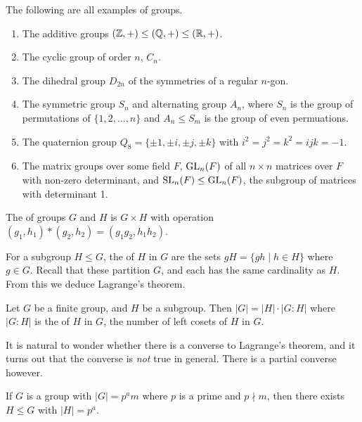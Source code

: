 \documentclass[a4paper]{scrartcl}
\begin{document}
\begin{example}
	The following are all examples of groups.
	\begin{enumerate}[label=(\roman*)]
		\item The additive groups $(\mathbb{Z}, +) \leq (\mathbb{Q}, +) \leq (\mathbb{R}, +)$.
		\item The cyclic group of order $n$, $C_n$.
		\item The dihedral group $D_{2n}$ of the symmetries of a regular $n$-gon.
		\item The symmetric group $S_n$ and alternating group $A_n$, where $S_n$ is the group of permutations of $\{1, 2, \dots, n\}$ and $A_n \leq S_m$ is the group of even permuations. 
		\item The quaternion group $Q_8 = \{\pm 1, \pm i, \pm j, \pm k \}$ with $i^2 = j^2 = k^2 = ijk = -1$.
		\item The matrix groups over some field $F$, $\operatorname{GL}_n(F)$ of all $n \times n$ matrices over $F$ with non-zero determinant, and $\operatorname{SL}_n(F) \leq \operatorname{GL}_n(F)$, the subgroup of matrices with determinant 1.
	\end{enumerate}
\end{example}

\begin{definition}
	The  of groups $G$ and $H$ is $G \times H$ with operation $(g_1, h_1) * (g_2, h_2) = (g_1 g_2, h_1 h_2)$. 
\end{definition}

For a subgroup $H \leq G$, the  of $H$ in $G$ are the sets $gH = \{gh \mid h \in H \}$ where $g \in G$. Recall that these partition $G$, and each has the same cardinality as $H$. From this we deduce Lagrange's theorem.

\begin{theorem}
	Let $G$ be a finite group, and $H$ be a subgroup. Then $|G| = |H| \cdot |G : H|$ where $|G : H|$ is the  of $H$ in $G$, the number of left cosets of $H$ in $G$.
\end{theorem}

It is natural to wonder whether there is a converse to Lagrange's theorem, and it turns out that the converse is \emph{not} true in general. There is a partial converse however.

\begin{theorem}
	If $G$ is a group with $|G| = p^a m$ where $p$ is a prime and $p \nmid m$, then there exists $H \leq G$ with $|H| = p^a$.
\end{theorem}
\end{document}
